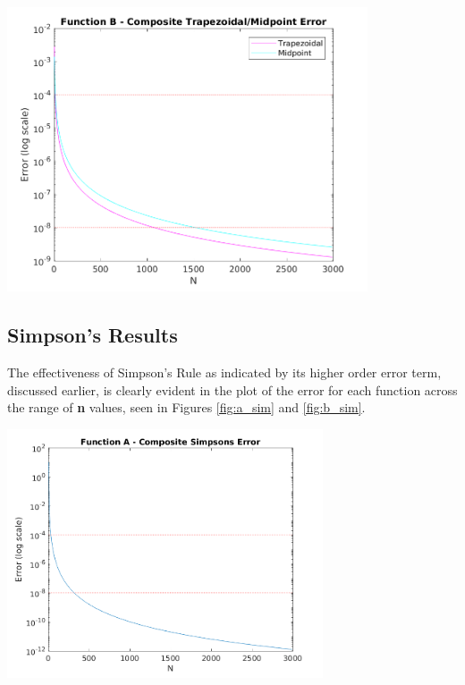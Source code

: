 \documentclass[a4paper]{article}
\begin{document}
\begin{center}
	\includegraphics[width=0.8\textwidth]{../output/b_trapezoidal_midpoint.png}
	\label{fig:b_trap_mid}
\end{center}


\subsection{Simpson's Results}\label{results:sim}

The effectiveness of Simpson's Rule as indicated by its higher order error term, discussed earlier, is clearly evident in the plot of the error for each function across the range of \textbf{n} values, seen in Figures \ref{fig:a_sim} and \ref{fig:b_sim}.

\begin{center}
	\includegraphics[width=0.7\textwidth]{../output/a_simpsons.png}
	\label{fig:a_sim}
\end{center}
\end{document}
